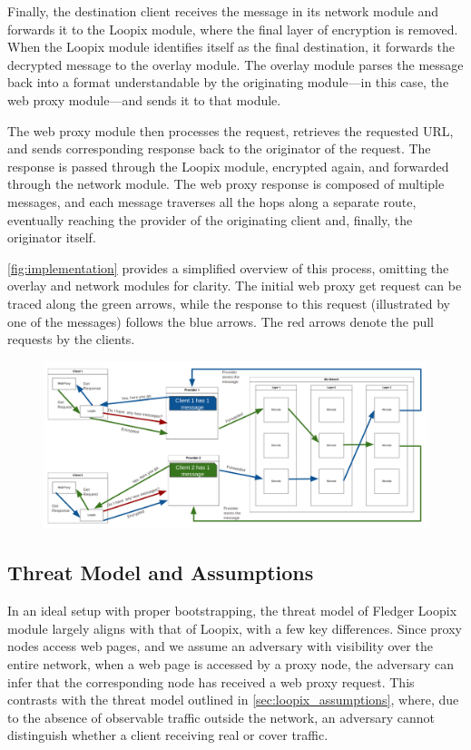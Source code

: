 \documentclass[a4paper,11pt,oneside]{report}
\begin{document}
Finally, the destination client receives the message in its network module and forwards it to the Loopix module, where the final layer of encryption is removed. When the Loopix module identifies itself as the final destination, it forwards the decrypted message to the overlay module. The overlay module parses the message back into a format understandable by the originating module—in this case, the web proxy module—and sends it to that module.

The web proxy module then processes the request, retrieves the requested URL, and sends corresponding response back to the originator of the request. The response is passed through the Loopix module, encrypted again, and forwarded through the network module. The web proxy response is composed of multiple messages, and each message traverses all the hops along a separate route, eventually reaching the provider of the originating client and, finally, the originator itself.

\autoref{fig:implementation} provides a simplified overview of this process, omitting the overlay and network modules for clarity. The initial web proxy get request can be traced along the green arrows, while the response to this request (illustrated by one of the messages) follows the blue arrows. The red arrows denote the pull requests by the clients.

\begin{figure}[H]
    \centering
    \includegraphics[width=1\linewidth]{plots/implementation.png}
    \caption{}
    \label{fig:implementation}
\end{figure}

\subsection{Threat Model and Assumptions}
\label{sec:fledger_loopix_assumptions}

In an ideal setup with proper bootstrapping, the threat model of Fledger Loopix module largely aligns with that of Loopix, with a few key differences. Since proxy nodes access web pages, and we assume an adversary with visibility over the entire network, when a web page is accessed by a proxy node, the adversary can infer that the corresponding node has received a web proxy request. This contrasts with the threat model outlined in \autoref{sec:loopix_assumptions}, where, due to the absence of observable traffic outside the network, an adversary cannot distinguish whether a client receiving real or cover traffic.
\end{document}
